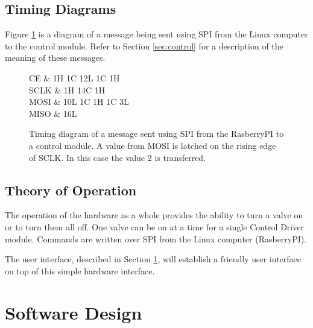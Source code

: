 \documentclass{article}
\begin{document}


\FloatBarrier
\subsection{Timing Diagrams}

Figure \ref{fig:timing} is a diagram of a message being sent
using SPI from the Linux computer to the control module.
Refer to Section \ref{sec:control} for a description of
the meaning of these messages.

\begin{figure}[h!]
\begin{center}
\begin{tikztimingtable}
	[xscale=2.0, yscale=2.0]
	CE	 & {1H} 1{C} {12L} 1{C} {1H} \\
	SCLK & {1H} 14{C} {1H} \\
	MOSI & 10L 1{C} 1{H} 1{C} 3L \\
	MISO & 16L \\
\end{tikztimingtable}
\end{center}
\caption{Timing diagram of a message sent using SPI from
the RasberryPI to a control module.
A value from MOSI is latched on the rising edge of SCLK.
In this case the value 2 is transferred.}
\label{fig:timing}
\end{figure}

\FloatBarrier
\subsection{Theory of Operation}


The operation of the hardware as a whole provides the ability to
turn a valve on or to turn them all off.
One valve can be on at a time for a single Control Driver module.
Commands are written over SPI from the Linux computer (RasberryPI).

The user interface, described in Section \ref{sec:swdesign}, will
establish a friendly user interface on top of this simple hardware
interface.



\FloatBarrier
\section{Software Design}
\label{sec:swdesign}
\end{document}
